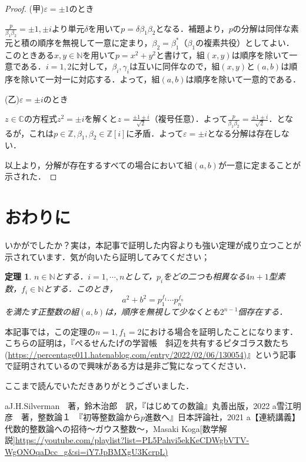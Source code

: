 \documentclass[dvipdfmx]{jsarticle}
\newtheorem*{theorem*}{定理}
\begin{document}
\begin{proof}
(甲)\quad$\varepsilon=\pm1$のとき

$\frac{p}{\beta_1\beta_2}=\pm1,\pm i$より単元$\delta$を用いて$p=\delta\beta_1\beta_2$となる．補題より，$p$の分解は同伴な素元と積の順序を無視して一意に定まり，$\beta_2=\beta_1^*$（$\beta_1$の複素共役）としてよい．このときある$x,y\in\mathbb{N}$を用いて$p=x^2+y^2$と書けて，組$(x,y)$は順序を除いて一意である．$i=1,2$に対して，$\beta_i,\gamma_i$は互いに同伴なので，組$(x,y)$と$(a,b)$は順序を除いて一対一に対応する．よって，組$(a,b)$は順序を除いて一意的である．

(乙)\quad$\varepsilon=\pm i$のとき

$z\in\mathbb{C}$の方程式$z^2=\pm i$を解くと$z=\frac{\pm1\pm i}{\sqrt{2}}$（複号任意）．よって$\frac{p}{\beta_1\beta_2}=\frac{\pm1\pm i}{\sqrt{2}}$．となるが，これは$p\in\mathbb{Z},\beta_1,\beta_2\in\mathbb{Z}[i]$に矛盾．よって$\varepsilon=\pm i$となる分解は存在しない．

以上より，分解が存在するすべての場合において組$(a,b)$が一意に定まることが示された．
\end{proof}



\section{おわりに}

いかがでしたか？実は，本記事で証明した内容よりも強い定理が成り立つことが示されています．気が向いたら証明してみてください；

\begin{theorem*}

$n\in\mathbb{N}$とする．$i=1,\cdots,n$として，$p_i$をどの二つも相異なる$4n+1$型素数，$f_i\in\mathbb{N}$とする．このとき，
$$a^2+b^2=p_1^{f_1}\cdots p_n^{f_n}$$
を満たす正整数の組$(a,b)$は，順序を無視して少なくとも$2^{n-1}$個存在する．
\end{theorem*}

本記事では，この定理の$n=1,f_1=2$における場合を証明したことになります．こちらの証明は，『ぺるせんたげの学習帳　斜辺を共有するピタゴラス数たち(\url{https://percentage011.hatenablog.com/entry/2022/02/06/130054})』という記事で証明されているので興味がある方は是非ご覧になってください．

ここまで読んでいただきありがとうございました．


\begin{thebibliography}{Silverman}
 \bibitem  aJ.H.Silverman　著，鈴木治郎　訳，『はじめての数論』丸善出版，2022
 \bibitem  a雪江明彦　著，整数論１　『初等整数論から$p$進数へ』日本評論社，2021
 \bibitem  a【連続講義】代数的整数論への招待〜ガウス整数〜，Masaki Koga[数学解説]\url{https://youtube.com/playlist?list=PL5Pahvi5ekKeCDWgbVTV-WgONOqaDcc_g&si=iY7JpBMXgU3KcrpL)}
\end{thebibliography}
\end{document}
